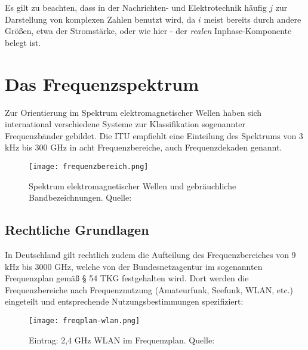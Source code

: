 Es gilt zu beachten, dass in der Nachrichten- und Elektrotechnik häufig $j$ zur Darstellung von komplexen Zahlen benutzt wird, da $i$ meist bereits durch andere Größen, etwa der Stromstärke, oder wie hier - der \textit{realen} Inphase-Komponente belegt ist.


\newpage
\section{Das Frequenzspektrum}
\label{section-frequenzbereiche}
Zur Orientierung im Spektrum elektromagnetischer Wellen haben sich international verschiedene Systeme zur Klassifikation sogenannter Frequenzbänder gebildet. Die \ac{ITU} empfiehlt eine Einteilung des Spektrums von 3 kHz bis 300 GHz in acht Frequenzbereiche, auch Frequenzdekaden genannt. \cite[vgl. ITU-R v.431-8]{itu-431:2015}

\begin{figure}[ht]
	\centering
	\texttt{[image: frequenzbereich.png]}
	\caption[Spektrum elektromagnetischer Wellen und gebräuchliche Bandbezeichnungen]{Spektrum elektromagnetischer Wellen und gebräuchliche Bandbezeichnungen. Quelle: \cite[Kark, S. 1]{Kark:2017}} 
	\label{frequenzbereiche}
\end{figure}






\subsection{Rechtliche Grundlagen} %
In Deutschland gilt rechtlich zudem die Aufteilung des Frequenzbereiches von 9 kHz bis 3000 GHz, welche von der Bundesnetzagentur im sogenannten Frequenzplan \cite[Bundesnetzagentur, 2016]{bundesnetzagentur-frequenzplan:2016} gemäß § 54 TKG festgehalten wird.
Dort werden die Frequenzbereiche nach Frequenznutzung (Amateurfunk, Seefunk, WLAN, etc.) eingeteilt und entsprechende Nutzungsbestimmungen spezifiziert:

\begin{figure}[ht]
	\centering
	\texttt{[image: freqplan-wlan.png]}
	\caption[Eintrag: 2,4 GHz WLAN im Frequenzplan]{Eintrag: 2,4 GHz WLAN im Frequenzplan. Quelle: \cite[Bundesnetzagentur, 2016]{bundesnetzagentur-frequenzplan:2016}}
	\label{frequenzplan-wlan}
\end{figure}







